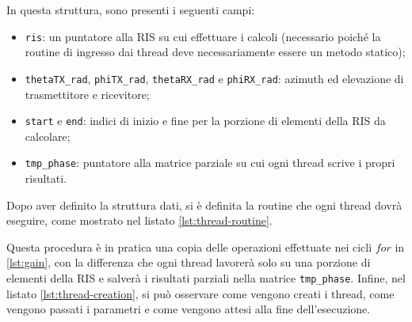 \vspace{1em}

\vspace{1em}

In questa struttura, sono presenti i seguenti campi:

\begin{itemize}
  \item \texttt{ris}: un puntatore alla RIS su cui effettuare i calcoli (necessario
    poiché la routine di ingresso dai thread deve necessariamente essere un
    metodo statico);

  \item \texttt{thetaTX\_rad}, \texttt{phiTX\_rad}, \texttt{thetaRX\_rad} e
    \texttt{phiRX\_rad}: azimuth ed elevazione di trasmettitore e ricevitore;

  \item \texttt{start} e \texttt{end}: indici di inizio e fine per la porzione
    di elementi della RIS da calcolare;

  \item \texttt{tmp\_phase}: puntatore alla matrice parziale su cui ogni thread scrive
    i propri risultati.
\end{itemize}

Dopo aver definito la struttura dati, si è definita la routine che ogni thread
dovrà eseguire, come mostrato nel listato \ref{lst:thread-routine}.

\vspace{1em}

\vspace{1em}

Questa procedura è in pratica una copia delle operazioni effettuate nei cicli
$for$ in \ref{lst:gain}, con la differenza che ogni thread lavorerà solo su una porzione
di elementi della RIS e salverà i risultati parziali nella matrice \texttt{tmp\_phase}.
Infine, nel listato \ref{lst:thread-creation}, si può osservare come vengono creati
i thread, come vengono passati i parametri e come vengono attesi alla fine dell'esecuzione.

\vspace{1em}


